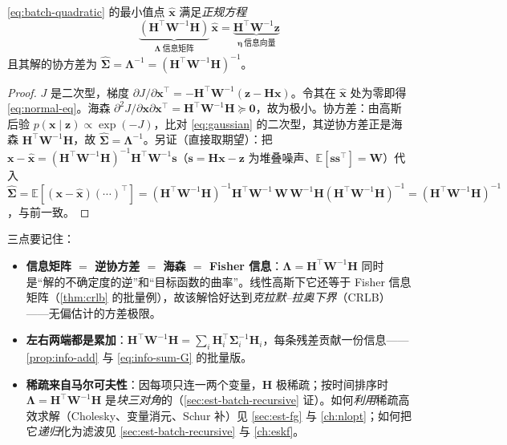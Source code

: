 \begin{theorem}[正规方程]\label{thm:normal-eq}
\cref{eq:batch-quadratic} 的最小值点 $\hat{\mathbf{x}}$ 满足\emph{正规方程}
\begin{equation}
  \boxed{\ \underbrace{(\mathbf{H}^\top\mathbf{W}^{-1}\mathbf{H})}_{\textstyle\boldsymbol{\Lambda}\ \text{信息矩阵}}\,\hat{\mathbf{x}}
  =\underbrace{\mathbf{H}^\top\mathbf{W}^{-1}\mathbf{z}}_{\textstyle\boldsymbol{\eta}\ \text{信息向量}}\ }
  \label{eq:normal-eq}
\end{equation}
且其解的协方差为 $\hat{\boldsymbol{\Sigma}}=\boldsymbol{\Lambda}^{-1}=(\mathbf{H}^\top\mathbf{W}^{-1}\mathbf{H})^{-1}$。
\end{theorem}
\begin{proof}
$J$ 是二次型，梯度 $\partial J/\partial\mathbf{x}^\top=-\mathbf{H}^\top\mathbf{W}^{-1}(\mathbf{z}-\mathbf{H}\mathbf{x})$。令其在 $\hat{\mathbf{x}}$ 处为零即得 \cref{eq:normal-eq}。海森 $\partial^2 J/\partial\mathbf{x}\partial\mathbf{x}^\top=\mathbf{H}^\top\mathbf{W}^{-1}\mathbf{H}\succeq\mathbf{0}$，故为极小。协方差：由高斯后验 $p(\mathbf{x}\mid\mathbf{z})\propto\exp(-J)$，比对 \cref{eq:gaussian} 的二次型，其逆协方差正是海森 $\mathbf{H}^\top\mathbf{W}^{-1}\mathbf{H}$，故 $\hat{\boldsymbol{\Sigma}}=\boldsymbol{\Lambda}^{-1}$。另证（直接取期望）：把 $\mathbf{x}-\hat{\mathbf{x}}=(\mathbf{H}^\top\mathbf{W}^{-1}\mathbf{H})^{-1}\mathbf{H}^\top\mathbf{W}^{-1}\mathbf{s}$（$\mathbf{s}=\mathbf{H}\mathbf{x}-\mathbf{z}$ 为堆叠噪声、$\mathbb{E}[\mathbf{s}\mathbf{s}^\top]=\mathbf{W}$）代入 $\hat{\boldsymbol{\Sigma}}=\mathbb{E}[(\mathbf{x}-\hat{\mathbf{x}})(\cdots)^\top]=(\mathbf{H}^\top\mathbf{W}^{-1}\mathbf{H})^{-1}\mathbf{H}^\top\mathbf{W}^{-1}\,\mathbf{W}\,\mathbf{W}^{-1}\mathbf{H}(\mathbf{H}^\top\mathbf{W}^{-1}\mathbf{H})^{-1}=(\mathbf{H}^\top\mathbf{W}^{-1}\mathbf{H})^{-1}$，与前一致。
\end{proof}

\noindent 三点要记住：
\begin{itemize}
  \item \textbf{信息矩阵 $=$ 逆协方差 $=$ 海森 $=$ Fisher 信息}：$\boldsymbol{\Lambda}=\mathbf{H}^\top\mathbf{W}^{-1}\mathbf{H}$ 同时是“解的不确定度的逆”和“目标函数的曲率”。线性高斯下它还等于 Fisher 信息矩阵（\cref{thm:crlb} 的批量例），故该解恰好达到\emph{克拉默–拉奥下界}（CRLB）——无偏估计的方差极限\cite{barfoot2024state}。
  \item \textbf{左右两端都是累加}：$\mathbf{H}^\top\mathbf{W}^{-1}\mathbf{H}=\sum_i\mathbf{H}_i^\top\boldsymbol{\Sigma}_i^{-1}\mathbf{H}_i$，每条残差贡献一份信息——\cref{prop:info-add} 与 \cref{eq:info-sum-G} 的批量版。
  \item \textbf{稀疏来自马尔可夫性}：因每项只连一两个变量，$\mathbf{H}$ 极稀疏；按时间排序时 $\boldsymbol{\Lambda}=\mathbf{H}^\top\mathbf{W}^{-1}\mathbf{H}$ 是\emph{块三对角}的（\cref{sec:est-batch-recursive} 证）。如何\emph{利用}稀疏高效求解（Cholesky、变量消元、Schur 补）见 \cref{sec:est-fg} 与 \cref{ch:nlopt}；如何把它\emph{递归}化为滤波见 \cref{sec:est-batch-recursive} 与 \cref{ch:eskf}。
\end{itemize}

